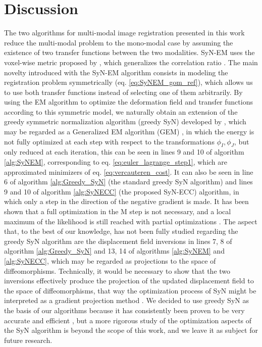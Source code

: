 \section{Discussion}
    The two algorithms for multi-modal image registration presented in this work reduce the multi-modal problem to the mono-modal case by assuming the existence of two transfer functions between the two modalities. SyN-EM uses the voxel-wise metric proposed by \cite{Arce-santana2014}, which generalizes the correlation ratio \citep{Roche1998}. The main novelty introduced with the SyN-EM algorithm consists in modeling the registration problem symmetrically (eq. \eqref{eq:SyNEM_gom_ref}), which allows us to use both transfer functions instead of selecting one of them arbitrarily. By using the EM algorithm to optimize the deformation field and transfer functions according to this symmetric model, we naturally obtain an extension of the greedy symmetric normalization algorithm (greedy SyN) developed by \cite{Avants2008, Avants2011}, which may be regarded as a Generalized EM algorithm (GEM) \citep{Neal1998}, in which the energy is not fully optimized at each step with respect to the transformations $\phi_{I}, \phi_{J}$, but only reduced at each iteration, this can be seen in lines 9 and 10 of algorithm \ref{alg:SyNEM}, corresponding to eq. \eqref{eq:euler_lagrange_step1}, which are approximated minimizers of eq. \eqref{eq:vercauteren_cost}. It can also be seen in line 6 of algorithm \ref{alg:Greedy_SyN} (the standard greedy SyN algorithm) and lines 9 and 10 of algorithm \ref{alg:SyNECC} (the proposed SyN-ECC) algorithm, in which only a step in the direction of the negative gradient is made. It has been shown that a full optimization in the M step is not necessary, and a local maximum of the likelihood is still reached with partial optimizations \citep{Neal1998}. The aspect that, to the best of our knowledge, has not been fully studied regarding the greedy SyN algorithm are the displacement field inversions in lines 7, 8 of algorithm \ref{alg:Greedy_SyN} and 13, 14 of algorithms \ref{alg:SyNEM} and \ref{alg:SyNECC}, which may be regarded as projections to the space of diffeomorphisms. Technically, it would be necessary to show that the two inversions effectively produce the projection of the updated displacement field to the space of diffeomorphisms, that way the optimization process of SyN might be interpreted as a gradient projection method \citep{Xiu2007}. We decided to use greedy SyN as the basis of our algorithms because it has consistently been proven to be very accurate and efficient \citep{Klein2009, Klein2010, Rohlfing2012}, but a more rigorous study of the optimization aspects of the SyN algorithm is beyond the scope of this work, and we leave it as subject for future research.\\

